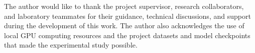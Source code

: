 The author would like to thank the project supervisor, research
collaborators, and laboratory teammates for their guidance, technical
discussions, and support during the development of this work. The author
also acknowledges the use of local GPU computing resources and the
project datasets and model checkpoints that made the experimental study
possible.
